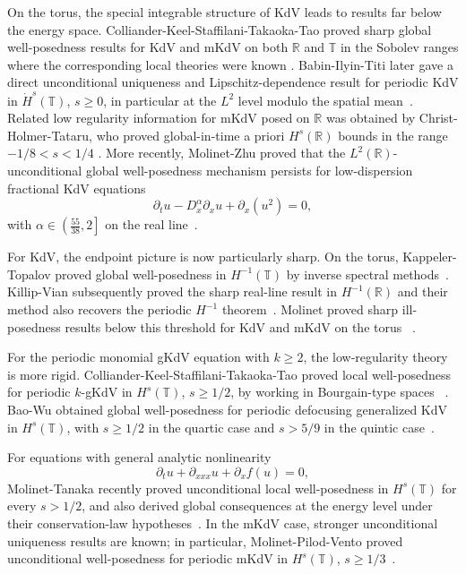 \documentclass[12pt,reqno,letterpaper]{amsart}
\numberwithin{equation}{section}
\newcommand{\1}{{\bf 1}}
\newcommand{\2}{{\bf 2}}
\newcommand{\R}{\mathbb R}
\newcommand{\T}{\mathbb T}
\theoremstyle{remark}
\theoremstyle{remark}
\begin{document}
On the torus, the special integrable structure of \textsf{KdV} leads to results far below the energy space. Colliander-Keel-Staffilani-Takaoka-Tao proved sharp global well-posedness results for \textsf{KdV} and \textsf{mKdV} on both $\R$ and $\T$ in the Sobolev ranges where the corresponding local theories were known \cite{CKSTTSharp}. Babin-Ilyin-Titi later gave a direct unconditional uniqueness and Lipschitz-dependence result for periodic \textsf{KdV} in $\dot H^s(\T)$, $s\ge0$, in particular at the $L^2$ level modulo the spatial mean~\cite{BIT}. Related low regularity information for \textsf{mKdV} posed on $\R$ was obtained by Christ-Holmer-Tataru, who proved global-in-time a priori $H^s(\R)$ bounds in the range $-1/8<s<1/4$ \cite{CHT}. More recently, Molinet-Zhu proved that the $L^2(\R)$-unconditional global well-posedness mechanism persists for low-dispersion fractional \textsf{KdV} equations
\[
    \partial_t u-D_x^\alpha\partial_xu+\partial_x(u^2)=0,
\]
with $\alpha\in\left(\frac{55}{38},2\right]$ on the real line~\cite{MZ}.

For \textsf{KdV}, the endpoint picture is now particularly sharp. On the torus, Kappeler-Topalov proved global well-posedness in $H^{-1}(\T)$ by inverse spectral methods~\cite{KT}.  Killip-Vian subsequently proved the sharp real-line result in $H^{-1}(\R)$ and their method also recovers the periodic $H^{-1}$ theorem~\cite{KV}. Molinet proved sharp ill-posedness results below this threshold for \textsf{KdV} and \textsf{mKdV} on the torus ~\cite{Molinet2011,Molinet2012}.

For the periodic monomial \textsf{gKdV} equation with $k \ge 2$, the low-regularity theory is more rigid. Colliander-Keel-Staffilani-Takaoka-Tao proved local well-posedness for periodic $k$-\textsf{gKdV} in $H^s(\T)$, $s \ge 1/2$, by working in Bourgain-type spaces ~\cite{CKSTT2004}. Bao-Wu obtained global well-posedness for periodic defocusing generalized \textsf{KdV} in $H^s(\T)$, with $s \ge 1/2$ in the quartic case and $s > 5/9$ in the quintic case~\cite{BaoWu}.

For equations with general analytic nonlinearity
\[
\partial_t u + \partial_{xxx} u +\partial_x f(u) = 0,
\]
Molinet-Tanaka recently proved unconditional local well-posedness in $H^s(\T)$ for every $s> 1/2$, and also derived global consequences at the energy level under their conservation-law hypotheses~\cite{MT}. In the mKdV case, stronger unconditional uniqueness results are known; in particular, Molinet-Pilod-Vento proved unconditional well-posedness for periodic \textsf{mKdV} in $H^s(\T)$, $s \ge 1/3$~\cite{MolinetPilodVento}.
\end{document}
